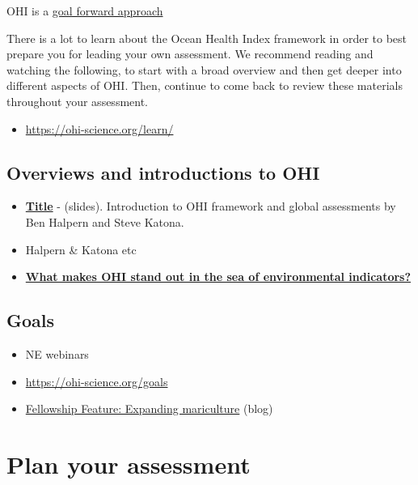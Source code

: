 \documentclass[
]{book}
\providecommand{\tightlist}{%
  \setlength{\itemsep}{0pt}\setlength{\parskip}{0pt}}
\begin{document}
OHI is a \href{https://ohi-science.org/news/goal-forward-approach}{goal forward approach}

There is a lot to learn about the Ocean Health Index framework in order to best prepare you for leading your own assessment. We recommend reading and watching the following, to start with a broad overview and then get deeper into different aspects of OHI. Then, continue to come back to review these materials throughout your assessment.

\begin{itemize}
\tightlist
\item
  \url{https://ohi-science.org/learn/}
\end{itemize}

\hypertarget{overviews-and-introductions-to-ohi}{%
\section{Overviews and introductions to OHI}\label{overviews-and-introductions-to-ohi}}

\begin{itemize}
\tightlist
\item
  \href{link}{\textbf{Title}} - (slides). Introduction to OHI framework and global assessments by Ben Halpern and Steve Katona.
\item
  Halpern \& Katona etc
\item
  \href{https://ohi-science.org/news/goal-forward-approach}{\textbf{What makes OHI stand out in the sea of environmental indicators?}}
\end{itemize}

\hypertarget{goals}{%
\section{Goals}\label{goals}}

\begin{itemize}
\item
  NE webinars
\item
  \url{https://ohi-science.org/goals}
\item
  \href{https://ohi-science.org/news/fellowship-expanding-mariculture}{Fellowship Feature: Expanding mariculture} (blog)
\end{itemize}

\hypertarget{plan}{%
\chapter{Plan your assessment}\label{plan}}
\end{document}
